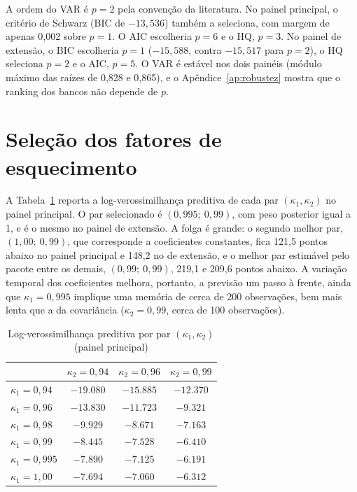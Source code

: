 A ordem do VAR é $p=2$ pela convenção da literatura. No painel principal, o
critério de Schwarz (BIC de $-13{,}536$) também a seleciona, com margem de
apenas 0,002 sobre $p=1$. O AIC escolheria $p=6$ e o HQ, $p=3$. No painel de
extensão, o BIC escolheria $p=1$ ($-15{,}588$, contra $-15{,}517$ para $p=2$),
o HQ seleciona $p=2$ e o AIC, $p=5$. O VAR é estável nos dois painéis (módulo
máximo das raízes de 0,828 e 0,865), e o Apêndice~\ref{ap:robustez} mostra que
o ranking dos bancos não depende de $p$.

\section{Seleção dos fatores de esquecimento}
\label{sec:res-kappa}

A Tabela~\ref{tab:grade-kappa} reporta a log-verossimilhança preditiva de cada
par $(\kappa_1,\kappa_2)$ no painel principal. O par selecionado é
$(0{,}995;\ 0{,}99)$, com peso posterior igual a 1, e é o mesmo no painel de
extensão. A folga é grande: o segundo melhor par, $(1{,}00;\ 0{,}99)$, que
corresponde a coeficientes constantes, fica 121,5 pontos abaixo no painel
principal e 148,2 no de extensão, e o melhor par estimável pelo pacote entre os
demais, $(0{,}99;\ 0{,}99)$, 219,1 e 209,6 pontos abaixo. A variação temporal
dos coeficientes melhora, portanto, a previsão um passo à frente, ainda que
$\kappa_1=0{,}995$ implique uma memória de cerca de 200 observações, bem mais
lenta que a da covariância ($\kappa_2=0{,}99$, cerca de 100 observações). 

\begin{table}[!htbp]
\centering
\caption{Log-verossimilhança preditiva por par $(\kappa_1,\kappa_2)$ (painel principal)}
\label{tab:grade-kappa}
\begin{tabular}{lccc}
\toprule
 & $\kappa_2=0{,}94$ & $\kappa_2=0{,}96$ & $\kappa_2=0{,}99$ \\
\midrule
$\kappa_1=0{,}94$  & $-19.080$ & $-15.885$ & $-12.370$ \\
$\kappa_1=0{,}96$  & $-13.830$ & $-11.723$ &  $-9.321$ \\
$\kappa_1=0{,}98$  &  $-9.929$ &  $-8.671$ &  $-7.163$ \\
$\kappa_1=0{,}99$  &  $-8.445$ &  $-7.528$ &  $-6.410$ \\
$\kappa_1=0{,}995$ &  $-7.890$ &  $-7.125$ & $\mathbf{-6.191}$ \\
$\kappa_1=1{,}00$  &  $-7.694$ &  $-7.060$ &  $-6.312$ \\
\bottomrule
\end{tabular}
\end{table}

